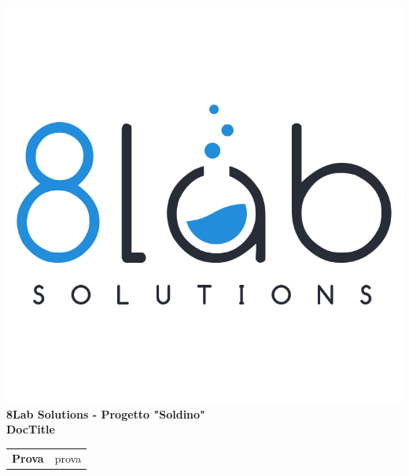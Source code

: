 \thispagestyle{empty}
\begin{titlepage}
	\begin{center}
		\includegraphics[scale = 1.0]{images/logo8.png}\\
		\large \textbf{8Lab Solutions - Progetto "Soldino"} \\
		\vfill
		\Huge \textbf{DocTitle}
		\vspace*{\fill}
        
        \vfill
        \large
        \begin{tabular}{r|l}
        	\textbf{Prova} & prova   \\     
        \end{tabular}
	\end{center}
\end{titlepage}
